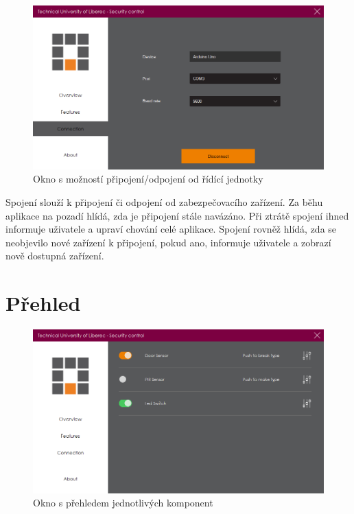 \documentclass[FM,DP]{tulthesis}  %
\begin{document}
\begin{figure}[H]
\begin{center}
\includegraphics[width=\textwidth]{images/connection.png}
\caption{Okno s možností připojení/odpojení od řídící jednotky}
\label{image}
\end{center}
\end{figure}

Spojení slouží k připojení či odpojení od zabezpečovacího zařízení. Za běhu aplikace na pozadí hlídá, zda je připojení stále navázáno. Při ztrátě spojení ihned informuje uživatele a upraví chování celé aplikace. Spojení rovněž hlídá, zda se neobjevilo nové zařízení k připojení, pokud ano, informuje uživatele a zobrazí nově dostupná zařízení.

\section{Přehled}

\begin{figure}[H]
\begin{center}
\includegraphics[width=\textwidth]{images/overview.png}
\caption{Okno s přehledem jednotlivých komponent}
\label{image}
\end{center}
\end{figure}
\end{document}
